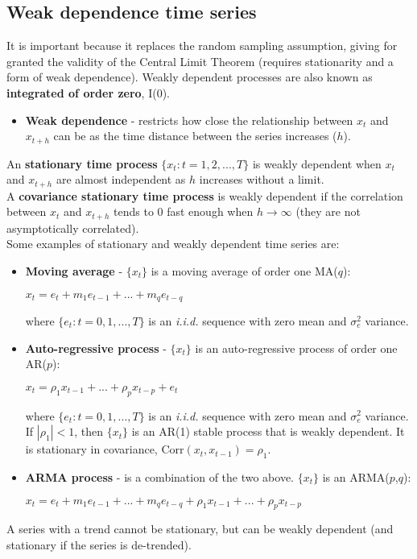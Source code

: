 \documentclass[10pt, a4paper, landscape]{extarticle}
\newcommand{\Corr}{\mathrm{Corr}}
\begin{document}
\begin{multicols}{3}
	\subsection*{Weak dependence time series}
		It is important because it replaces the random sampling assumption, giving for granted the validity of the Central Limit Theorem (requires stationarity and a form of weak dependence). Weakly dependent processes are also known as \textbf{integrated of order zero}, I(0).
		\begin{itemize}[leftmargin=*]
			\item \textbf{Weak dependence} - restricts how close the relationship between $x_t$ and $x_{t+h}$ can be as the time distance between the series increases ($h$).
		\end{itemize}
		An \textbf{stationary time process} $\lbrace x_t: t = 1, 2, ..., T \rbrace$ is weakly dependent when $x_t$ and $x_{t+h}$ are almost independent as $h$ increases without a limit. \\
		A \textbf{covariance stationary time process} is weakly dependent if the correlation between $x_t$ and $x_{t+h}$ tends to $0$ fast enough when $h \rightarrow \infty$ (they are not asymptotically correlated). \\
		Some examples of stationary and weakly dependent time series are:
		\begin{itemize}[leftmargin=*]
			\item \textbf{Moving average} - $\lbrace x_t \rbrace$ is a moving average of order one MA($q$):
			\begin{center}
				$x_t = e_t + m_1 e_{t-1} + ... + m_q e_{t-q}$
			\end{center}
			where $\lbrace e_t: t = 0, 1, ..., T \rbrace$ is an \textsl{i.i.d.} sequence with zero mean and $\sigma^2_e$ variance.
			\item \textbf{Auto-regressive process} - $\lbrace x_t \rbrace$ is an auto-regressive process of order one AR($p$):
			\begin{center}
				$x_t = \rho_1 x_{t-1} + ... + \rho_p x_{t-p} + e_t$
			\end{center}
			where $\lbrace e_t: t = 0, 1, ..., T \rbrace$ is an \textsl{i.i.d.} sequence with zero mean and $\sigma^2_e$ variance. \\
			If $|\rho_1|<1$, then $\lbrace x_t \rbrace$ is an AR(1) stable process that is weakly dependent. It is stationary in covariance, $\Corr(x_t, x_{t-1}) = \rho_1$.
			\item \textbf{ARMA process} - is a combination of the two above. $\lbrace x_t \rbrace$ is an ARMA($p$,$q$):
			\begin{center}
				$x_t = e_t + m_1 e_{t-1} + ... + m_q e_{t-q} + \rho_1 x_{t-1} + ... + \rho_p x_{t-p}$
			\end{center}
		\end{itemize}
		A series with a trend cannot be stationary, but can be weakly dependent (and stationary if the series is de-trended).
\columnbreak

\end{multicols}
\end{document}
